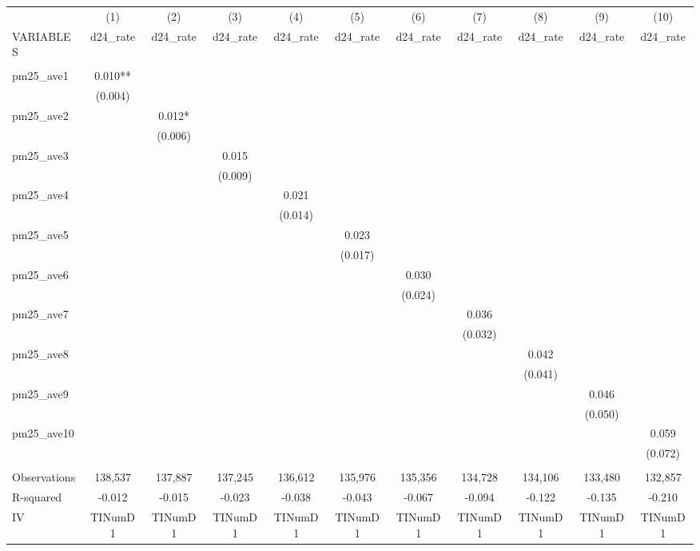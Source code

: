 \begin{tabular}{lcccccccccc} \hline
 & (1) & (2) & (3) & (4) & (5) & (6) & (7) & (8) & (9) & (10) \\
VARIABLES & d24\_rate & d24\_rate & d24\_rate & d24\_rate & d24\_rate & d24\_rate & d24\_rate & d24\_rate & d24\_rate & d24\_rate \\ \hline
 &  &  &  &  &  &  &  &  &  &  \\
pm25\_ave1 & 0.010** &  &  &  &  &  &  &  &  &  \\
 & (0.004) &  &  &  &  &  &  &  &  &  \\
pm25\_ave2 &  & 0.012* &  &  &  &  &  &  &  &  \\
 &  & (0.006) &  &  &  &  &  &  &  &  \\
pm25\_ave3 &  &  & 0.015 &  &  &  &  &  &  &  \\
 &  &  & (0.009) &  &  &  &  &  &  &  \\
pm25\_ave4 &  &  &  & 0.021 &  &  &  &  &  &  \\
 &  &  &  & (0.014) &  &  &  &  &  &  \\
pm25\_ave5 &  &  &  &  & 0.023 &  &  &  &  &  \\
 &  &  &  &  & (0.017) &  &  &  &  &  \\
pm25\_ave6 &  &  &  &  &  & 0.030 &  &  &  &  \\
 &  &  &  &  &  & (0.024) &  &  &  &  \\
pm25\_ave7 &  &  &  &  &  &  & 0.036 &  &  &  \\
 &  &  &  &  &  &  & (0.032) &  &  &  \\
pm25\_ave8 &  &  &  &  &  &  &  & 0.042 &  &  \\
 &  &  &  &  &  &  &  & (0.041) &  &  \\
pm25\_ave9 &  &  &  &  &  &  &  &  & 0.046 &  \\
 &  &  &  &  &  &  &  &  & (0.050) &  \\
pm25\_ave10 &  &  &  &  &  &  &  &  &  & 0.059 \\
 &  &  &  &  &  &  &  &  &  & (0.072) \\
 &  &  &  &  &  &  &  &  &  &  \\
Observations & 138,537 & 137,887 & 137,245 & 136,612 & 135,976 & 135,356 & 134,728 & 134,106 & 133,480 & 132,857 \\
R-squared & -0.012 & -0.015 & -0.023 & -0.038 & -0.043 & -0.067 & -0.094 & -0.122 & -0.135 & -0.210 \\
IV & TINumD1 & TINumD1 & TINumD1 & TINumD1 & TINumD1 & TINumD1 & TINumD1 & TINumD1 & TINumD1 & TINumD1 \\

\end{tabular}
